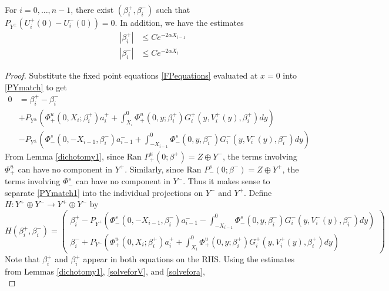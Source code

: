 \documentclass[thesis.tex]{subfiles}
\begin{document}
\begin{lemma}\label{solveforbeta}
For $i = 0, \dots, n-1$, there exist $(\beta_i^+, \beta_i^-)$ such that $P_{Y^\pm}(U_i^+(0) - U_i^-(0)) = 0$. In addition, we have the estimates
\begin{equation}\label{betaest}
\begin{aligned}
|\beta_i^+| &\leq C e^{-2 \alpha X_{i-1}} \\
|\beta_i^-| &\leq C e^{-2 \alpha X_i}
\end{aligned}
\end{equation}
\begin{proof}
Substitute the fixed point equations \eqref{FPequations} evaluated at $x = 0$ into \eqref{PYmatch} to get
\begin{equation}\label{PYmatch1}
\begin{aligned}
0 &= \beta_i^+ - \beta_i^- \\
&+ P_{Y^\pm} \left( \Phi^u_+(0, X_i; \beta_i^+) a_i^+ 
+ \int_{X_i}^0 \Phi_+^u(0, y; \beta_i^+) G_i^+(y, V_i^+(y),\beta_i^+)dy \right) \\
&- P_{Y^\pm} \left( \Phi^s_-(0, -X_{i-1}, \beta_i^-) a_{i-1}^- 
+ \int_{-X_{i-1}}^0 \Phi_-^s(0, y, \beta_i^-) G_i^-(y, V_i^-(y),\beta_i^-) dy \right) 
\end{aligned}
\end{equation}
From Lemma \ref{dichotomy1}, since $\text{Ran }P_+^u(0; \beta^+) = Z \oplus Y^-$, the terms involving $\Phi^u_+$ can have no component in $Y^+$. Similarly, since $\text{Ran }P_-^s(0; \beta^-) = Z \oplus Y^+$, the terms involving $\Phi^s_-$ can have no component in $Y^-$. Thus it makes sense to separate \eqref{PYmatch1} into the individual projections on $Y^-$ and $Y^+$. Define $H: Y^+ \oplus Y^- \rightarrow Y^+ \oplus Y^-$ by
\begin{equation}\label{defHPY}
H(\beta_i^+, \beta_i^-) = 
\begin{pmatrix}
\beta_i^+ - P_{Y^+}\left(\Phi^s_-(0, -X_{i-1}, \beta_i^-) a_{i-1}^- 
- \int_{-X_{i-1}}^0 \Phi_-^s(0, y, \beta_i^-) G_i^-(y, V_i^-(y),\beta_i^-) dy\right) \\
\beta_i^- + P_{Y^-}\left( \Phi^u_+(0, X_i; \beta_i^+) a_i^+ 
+ \int_{X_i}^0 \Phi_+^u(0, y; \beta_i^+) G_i^+(y, V_i^+(y),\beta_i^+)dy \right)
\end{pmatrix}
\end{equation}
Note that $\beta_i^+$ and $\beta_i^+$ appear in both equations on the RHS. Using the estimates from Lemmas \ref{dichotomy1}, \ref{solveforV}, and \ref{solvefora},
\begin{equation}\label{H0bound}

\end{equation}
\end{proof}
\end{lemma}
\end{document}
